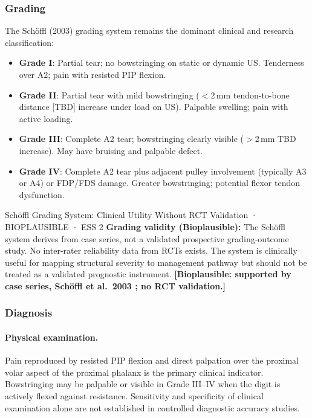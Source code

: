 \subsubsection{Grading}

The Sch\"{o}ffl (2003) grading system \cite{SHWS03} remains the dominant clinical and research classification:

\begin{itemize}[leftmargin=1.5em]
  \item \textbf{Grade I}: Partial tear; no bowstringing on static or dynamic US. Tenderness over A2; pain with resisted PIP flexion.
  \item \textbf{Grade II}: Partial tear with mild bowstringing ($<$2\,mm tendon-to-bone distance [TBD] increase under load on US). Palpable swelling; pain with active loading.
  \item \textbf{Grade III}: Complete A2 tear; bowstringing clearly visible ($>$2\,mm TBD increase). May have bruising and palpable defect.
  \item \textbf{Grade IV}: Complete A2 tear plus adjacent pulley involvement (typically A3 or A4) or FDP/FDS damage. Greater bowstringing; potential flexor tendon dysfunction.
\end{itemize}

\begin{bioplausbox}{Schöffl Grading System: Clinical Utility Without RCT Validation · BIOPLAUSIBLE · ESS 2}
\textbf{Grading validity (Bioplausible):} The Sch\"{o}ffl system derives from case series, not a validated prospective grading-outcome study. No inter-rater reliability data from RCTs exists. The system is clinically useful for mapping structural severity to management pathway but should not be treated as a validated prognostic instrument. \textbf{[Bioplausible: supported by case series, Sch\"{o}ffl et al.\ 2003 \cite{SHWS03}; no RCT validation.]}
\end{bioplausbox}

\subsubsection{Diagnosis}

\paragraph{Physical examination.}
Pain reproduced by resisted PIP flexion and direct palpation over the proximal volar aspect of the proximal phalanx is the primary clinical indicator. Bowstringing may be palpable or visible in Grade III--IV when the digit is actively flexed against resistance. Sensitivity and specificity of clinical examination alone are not established in controlled diagnostic accuracy studies.

